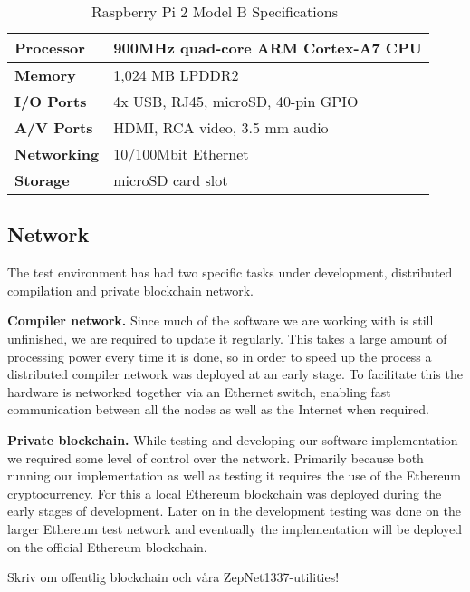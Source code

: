 \begin{table}[h]
\centering
\caption{Raspberry Pi 2 Model B Specifications~\cite{rpi}}
\label{rpi}
\begin{tabular}{|l|l|}
\hline \textbf{Processor} & 900MHz quad-core ARM Cortex-A7 CPU \\ \hline
\textbf{Memory} & 1,024 MB LPDDR2 \\ \hline 
\textbf{I/O Ports} & 4x USB, RJ45, microSD, 40-pin GPIO \\ \hline
\textbf{A/V Ports} & HDMI, RCA video, 3.5 mm audio \\ \hline
\textbf{Networking} & 10/100Mbit Ethernet \\ \hline
\textbf{Storage} & microSD card slot \\ \hline
\end{tabular}
\end{table}

\subsection{Network}
The test environment has had two specific tasks under development, distributed compilation and private blockchain network.

\textbf{Compiler network.} Since much of the software we are working with is still unfinished, we are required to update it regularly. This takes a large amount of processing power every time it is done, so in order to speed up the process a distributed compiler network was deployed at an early stage. To facilitate this the hardware is networked together via an Ethernet switch, enabling fast communication between all the nodes as well as the Internet when required. 

\textbf{Private blockchain.} While testing and developing our software implementation we required some level of control over the network. Primarily because both running our implementation as well as testing it requires the use of the Ethereum cryptocurrency. For this a local Ethereum blockchain was deployed during the early stages of development. Later on in the development testing was done on the larger Ethereum test network and eventually the implementation will be deployed on the official Ethereum blockchain.

Skriv om offentlig blockchain och våra ZepNet1337-utilities!

